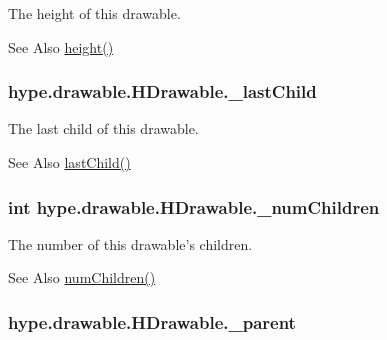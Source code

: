 The height of this drawable. 

\begin{DoxySeeAlso}{See Also}
\hyperlink{classhype_1_1drawable_1_1_h_drawable_a20f3702ab5c3ba050174503e5d3fae12}{height()} 
\end{DoxySeeAlso}
\hypertarget{classhype_1_1drawable_1_1_h_drawable_a913a87558ada09b12cbe57fd88ecdd10}{
\subsubsection[{\-\_\-last\-Child}]{ hype.\-drawable.\-H\-Drawable.\-\_\-last\-Child\hspace{0.3cm}{\ttfamily [protected]}}}\label{classhype_1_1drawable_1_1_h_drawable_a913a87558ada09b12cbe57fd88ecdd10}


The last child of this drawable. 

\begin{DoxySeeAlso}{See Also}
\hyperlink{classhype_1_1drawable_1_1_h_drawable_a1e774c59f6138a2e6c97a0de05360605}{last\-Child()} 
\end{DoxySeeAlso}
\hypertarget{classhype_1_1drawable_1_1_h_drawable_a1e2205f639598af5f419b82ae5bdc0cf}{
\subsubsection[{\-\_\-num\-Children}]{\setlength{\rightskip}{0pt plus 5cm}int hype.\-drawable.\-H\-Drawable.\-\_\-num\-Children\hspace{0.3cm}{\ttfamily [protected]}}}\label{classhype_1_1drawable_1_1_h_drawable_a1e2205f639598af5f419b82ae5bdc0cf}


The number of this drawable's children. 

\begin{DoxySeeAlso}{See Also}
\hyperlink{classhype_1_1drawable_1_1_h_drawable_a360bca8862db709ae7262a1b56b14dfa}{num\-Children()} 
\end{DoxySeeAlso}
\hypertarget{classhype_1_1drawable_1_1_h_drawable_a1f95d00444c6964efa4239ddf135a10e}{
\subsubsection[{\-\_\-parent}]{ hype.\-drawable.\-H\-Drawable.\-\_\-parent\hspace{0.3cm}{\ttfamily [protected]}}}\label{classhype_1_1drawable_1_1_h_drawable_a1f95d00444c6964efa4239ddf135a10e}


